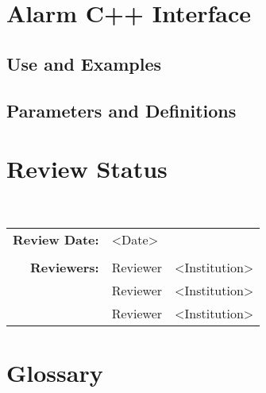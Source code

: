 \documentclass[]{article}
\begin{document}
\section{Alarm C++ Interface}

\subsection{Use and Examples}
%

\subsection{Parameters and Definitions}
%



\section{Review Status}

 \\

\begin{tabular}{r p{1.3in} p{2in}}
{\bf Review Date:} & <Date> \\ \\
{\bf Reviewers:}   & Reviewer           & <Institution> \\
                   & Reviewer           & <Institution> \\
                   & Reviewer           & <Institution>
\end{tabular}

\section{Glossary}


 

\end{document}
